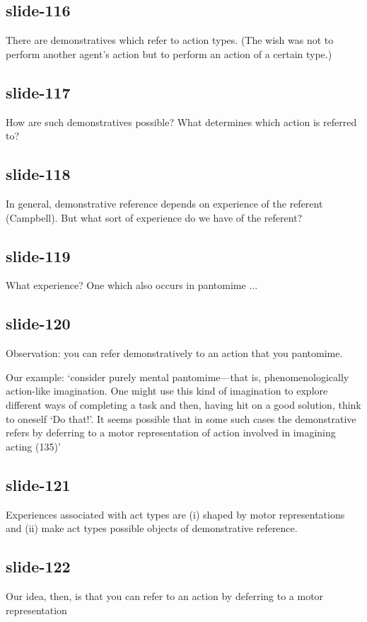\documentclass[12pt,\papersize]{extarticle}
\begin{document}
\subsection{slide-116}
There are demonstratives which refer to action types.
(The wish was not to perform another agent’s action but to perform an action of a certain
type.)

\subsection{slide-117}
How are such demonstratives possible? What determines which action is referred to?

\subsection{slide-118}
In general, demonstrative reference depends on experience of the referent (Campbell).
But what sort of experience do we have of the referent?

\subsection{slide-119}
What experience?   One which also occurs in pantomime ...

\subsection{slide-120}
Observation: you can refer demonstratively to an action that you pantomime.

Our example: ‘consider purely mental pantomime—that is, phenomenologically
action-like imagination. One might use this kind of imagination to explore
different ways of completing a task and then, having hit on a good
solution, think to oneself ‘Do that!’. It seems possible that in some such
cases the demonstrative refers by deferring to a motor representation of
action involved in imagining acting (135)’

\subsection{slide-121}
Experiences associated with act types are (i) shaped by motor representations and (ii)
make act types possible objects of demonstrative reference.

\subsection{slide-122}
Our idea, then, is that you can
refer to an action by deferring to a motor representation
\end{document}
